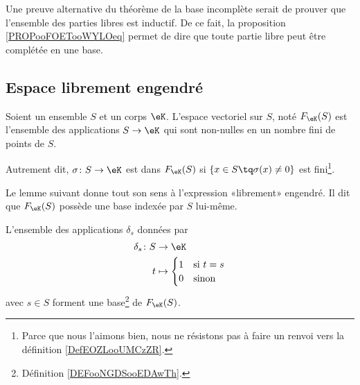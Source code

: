 \begin{normaltext}        \label{NORMooREVQooEFJWta}
	Une preuve alternative du théorème de la base incomplète serait de prouver que l'ensemble des parties libres est inductif. De ce fait, la proposition \ref{PROPooFOETooWYLOeq} permet de dire que toute partie libre peut être complétée en une base.
\end{normaltext}

\subsection{Espace librement engendré}

\begin{definition}       \label{DEFooCPNIooNxsYMY}
	Soient un ensemble \( S\) et un corps \(\eK \). L'espace vectoriel  sur \( S\), noté \( F_{\eK}(S)\) est l'ensemble des applications \( S\to \eK\) qui sont non-nulles en un nombre fini de points de \( S\).

	Autrement dit, \( \sigma\colon S\to \eK\) est dans \( F_{\eK}(S) \) si \( \{ x\in S\tq \sigma(x)\neq 0 \}\) est fini\footnote{Parce que nous l'aimons bien, nous ne résistons pas à faire un renvoi vers la définition \ref{DefEOZLooUMCzZR}.}.
\end{definition}

Le lemme suivant donne tout son sens à l'expression «librement» engendré. Il dit que \( F_{\eK}(S)\) possède une base indexée par \( S\) lui-même.
\begin{lemma}       \label{LEMooLOPAooUNQVku}
	L'ensemble des applications \( \delta_s\) données par
	\begin{equation}
		\begin{aligned}
			\delta_s\colon S & \to \eK                            \\
			t                & \mapsto \begin{cases}
				1 & \text{si } t=s \\
				0 & \text{sinon }
			\end{cases}
		\end{aligned}
	\end{equation}
	avec \( s\in S\) forment une base\footnote{Définition \ref{DEFooNGDSooEDAwTh}.} de \( F_{\eK}(S)\).
\end{lemma}

